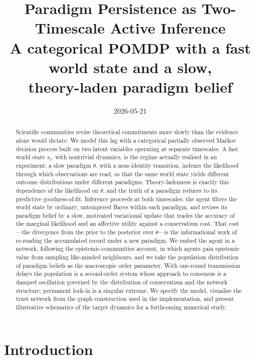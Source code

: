 \documentclass[11pt,a4paper]{article}
\title{\vspace{-2.5em}Paradigm Persistence as Two-Timescale Active Inference\\[3pt]
\large A categorical POMDP with a fast world state and a slow,\\
theory-laden paradigm belief}
\author{}
\date{2026-05-21}
\newcommand{\theory}{\theta}
\begin{document}
\maketitle
\vspace{-2em}

\begin{abstract}
\noindent
Scientific communities revise theoretical commitments more slowly than the
evidence alone would dictate. We model this lag with a categorical partially
observed Markov decision process built on two latent variables operating at
separate timescales. A fast world state $s_t$, with nontrivial dynamics, is the
regime actually realised in an experiment; a slow paradigm $\theory$, with a
near-identity transition, indexes the likelihood through which observations are
read, so that the same world state yields different outcome distributions under
different paradigms. Theory-ladenness is exactly this dependence of the likelihood
on $\theory$, and the truth of a paradigm reduces to its predictive
goodness-of-fit. Inference proceeds at both timescales: the agent filters the
world state by ordinary, untempered Bayes within each paradigm, and revises its
paradigm belief by a slow, motivated variational update that trades the accuracy
of the marginal likelihood and an affective utility against a conservatism cost.
That cost---the divergence from the prior to the posterior over $\theory$---is the
informational work of re-reading the accumulated record under a new paradigm. We
embed the agent in a network, following the epistemic-communities account, in
which agents gain epistemic value from sampling like-minded neighbours, and we
take the population distribution of paradigm beliefs as the macroscopic order
parameter. With one-round transmission delays the population is a second-order
system whose approach to consensus is a damped oscillation governed by the
distribution of conservatism and the network structure; permanent lock-in is a
singular extreme. We specify the model, visualise the trust network from the graph
construction used in the implementation, and present illustrative schematics of the
target dynamics for a forthcoming numerical study.
\end{abstract}

\section{Introduction}
\label{sec:intro}
\end{document}
